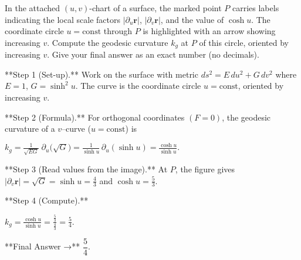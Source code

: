 In the attached $(u,v)$-chart of a surface, the marked point $P$ carries labels indicating the local scale factors $|\partial_{u}\mathbf{r}|$, $|\partial_{v}\mathbf{r}|$, and the value of $\cosh u$. The coordinate circle $u=\text{const}$ through $P$ is highlighted with an arrow showing increasing $v$. Compute the geodesic curvature $k_{g}$ at $P$ of this circle, oriented by increasing $v$. Give your final answer as an exact number (no decimals).

**Step 1 (Set-up).** Work on the surface with metric $ds^{2}=E\,du^{2}+G\,dv^{2}$ where $E=1$, $G=\sinh^{2}u$. The curve is the coordinate circle $u=\text{const}$, oriented by increasing $v$.

  

**Step 2 (Formula).** For orthogonal coordinates $(F=0)$, the geodesic curvature of a $v$–curve ($u=\text{const}$) is

$k_g=\frac{1}{\sqrt{EG}}\;\partial_u\!\big(\sqrt{G}\big) =\frac{1}{\sinh u}\,\partial_u(\sinh u) =\frac{\cosh u}{\sinh u}.$

**Step 3 (Read values from the image).** At $P$, the figure gives $|\partial_v\mathbf r|=\sqrt{G}=\sinh u=\tfrac{4}{3}$ and $\cosh u=\tfrac{5}{3}$.

  

**Step 4 (Compute).**

$k_g=\frac{\cosh u}{\sinh u} =\frac{\tfrac{5}{3}}{\tfrac{4}{3}} =\frac{5}{4}.$

  

**Final Answer →** $\boxed{\dfrac{5}{4}}$.
